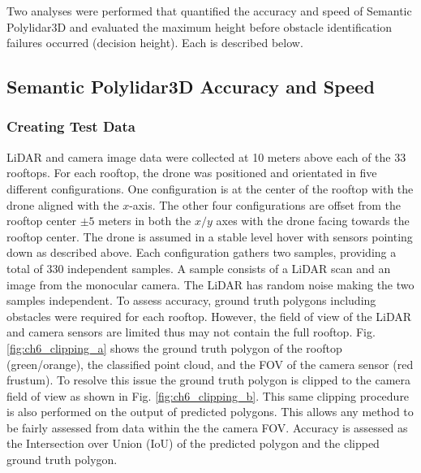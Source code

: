 Two analyses were performed that quantified the accuracy and speed of Semantic Polylidar3D and evaluated the maximum height before obstacle identification failures occurred (decision height).  Each is described below.

\subsection{Semantic Polylidar3D Accuracy and Speed} \label{sec:ch6_landing_accuracy}

\subsubsection{Creating Test Data}

LiDAR and camera image data were collected at 10 meters above each of the 33 rooftops. For each rooftop, the drone was positioned and orientated in five different configurations.  One configuration is at the center of the rooftop with the drone aligned with the $x$-axis. The other four configurations are offset from the rooftop center $\pm5$ meters in both the $x/y$ axes with the drone facing towards the rooftop center. The drone is assumed in a stable level hover with sensors pointing down as described above. Each configuration gathers two samples, providing a total of $330$ independent samples. A sample consists of a LiDAR scan and an image from the monocular camera. The LiDAR has random noise making the two samples independent. To assess accuracy, ground truth polygons including obstacles were required for each rooftop. However, the field of view of the LiDAR and camera sensors are limited thus may not contain the full rooftop. Fig. \ref{fig:ch6_clipping_a} shows the ground truth polygon of the rooftop (green/orange), the classified point cloud, and the FOV of the camera sensor (red frustum). To resolve this issue the ground truth polygon is clipped to the camera field of view as shown in Fig. \ref{fig:ch6_clipping_b}. This same clipping procedure is also performed on the output of predicted polygons. This allows any method to be fairly assessed from data within the the camera FOV. Accuracy is assessed as the Intersection over Union (IoU) of the predicted polygon and the clipped ground truth polygon. 

